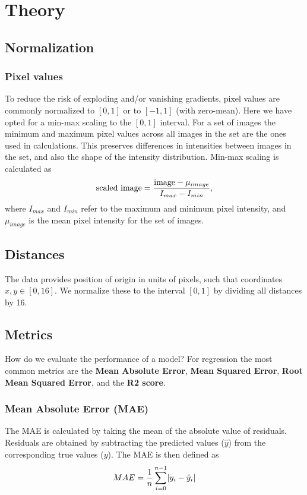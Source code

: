 \section{Theory}
\subsection{Normalization}
\subsubsection{Pixel values}
To reduce the risk of exploding and/or vanishing gradients, pixel values are 
commonly normalized to $[0, 1]$ or to $[-1, 1]$ (with zero-mean). 
Here we have opted for a min-max scaling to the $[0, 1]$ interval.
For a set of images the minimum and maximum pixel values across all images
in the set are the ones used in calculations. This preserves differences in
intensities between images in the set, and also the shape of the intensity 
distribution. Min-max scaling is calculated as
\begin{equation}
    \text{scaled image} = \frac{\text{image} - \mu_{image}}{I_{max} - I_{min}},
\end{equation}
where $I_{max}$ and $I_{min}$ refer to the maximum and minimum pixel intensity,
and $\mu_{image}$ is the mean pixel intensity for the set of images.

\subsection{Distances}
The data provides position of origin in units of pixels, such that coordinates
$x,y \in [0,16]$. We normalize these to the interval $[0,1]$ by dividing all
distances by 16.

\subsection{Metrics}
How do we evaluate the performance of a model? For regression the most common
metrics are the \textbf{Mean Absolute Error}, 
\textbf{Mean Squared Error}, \textbf{Root Mean Squared Error}, and the \textbf{R2 score}.

\subsubsection{Mean Absolute Error (MAE)}
The MAE is calculated by taking the mean of the absolute value of residuals.
Residuals are obtained by subtracting the predicted values ($\hat{y}$) from the 
corresponding true values ($y$).
The MAE is then defined as
\begin{equation}\label{metrics:mae}
    MAE = \frac{1}{n}\sum_{i=0}^{n-1}\abs{y_i - \hat{y}_i}
\end{equation}

